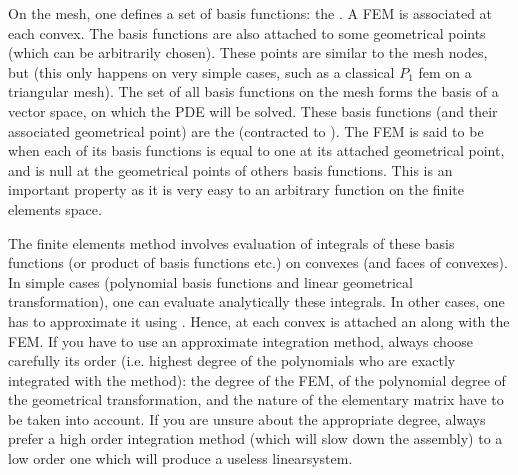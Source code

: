 \documentclass[a4paper,11pt,english]{sphinxmanual}
\begin{document}
\sphinxAtStartPar
On the mesh, one defines a set of basis functions: the . A FEM is
associated at each convex. The basis functions are also attached to some
geometrical points (which can be arbitrarily chosen). These points are similar to
the mesh nodes, but  (this only happens on very
simple cases, such as a classical \(P_1\) fem on a triangular mesh). The set
of all basis functions on the mesh forms the basis of a vector space, on which the
PDE will be solved. These basis functions (and their associated geometrical point)
are the  (contracted to ). The FEM is
said to be  when each of its basis functions is equal to one
at its attached geometrical point, and is null at the geometrical points of others
basis functions. This is an important property as it is very easy to
 an arbitrary function on the finite elements space.

\sphinxAtStartPar
The finite elements method involves evaluation of integrals of these basis
functions (or product of basis functions etc.) on convexes (and faces of
convexes). In simple cases (polynomial basis functions and linear geometrical
transformation), one can evaluate analytically these integrals. In other cases,
one has to approximate it using . Hence, at each
convex is attached an  along with the FEM. If you have
to use an approximate integration method, always choose carefully its order (i.e.
highest degree of the polynomials who are exactly integrated with the method): the
degree of the FEM, of the polynomial degree of the geometrical transformation, and
the nature of the elementary matrix have to be taken into account. If you are
unsure about the appropriate degree, always prefer a high order integration method
(which will slow down the assembly) to a low order one which will produce a
useless linear\sphinxhyphen{}system.
\end{document}
